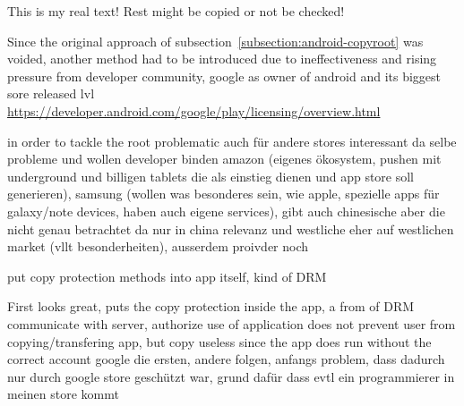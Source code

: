 This is my real text! Rest might be copied or not be checked!

Since the original approach of subsection~\ref{subsection:android-copyroot} was voided, another method had to be introduced due to ineffectiveness and rising pressure from developer community, google as owner of android and its biggest sore released lvl \url{https://developer.android.com/google/play/licensing/overview.html}

in order to tackle the root problematic 
auch für andere stores interessant da selbe probleme und wollen developer binden
amazon (eigenes ökosystem, pushen mit underground und billigen tablets die als einstieg dienen und app store soll generieren), samsung (wollen was besonderes sein, wie apple, spezielle apps für galaxy/note devices, haben auch eigene services), gibt auch chinesische aber die nicht genau betrachtet da nur in china relevanz und westliche eher auf westlichen market (vllt besonderheiten), ausserdem proivder noch
\cite{munteanLicense}


put copy protection methods into app itself, kind of DRM


First looks great, puts the copy protection inside the app, a from of DRM\newline
communicate with server, authorize use of application\newline
does not prevent user from copying/transfering app, but copy useless since the app does run without the correct account\newline
google die ersten, andere folgen, anfangs problem, dass dadurch nur durch google store geschützt war, grund dafür dass evtl ein programmierer in meinen store kommt\newline
